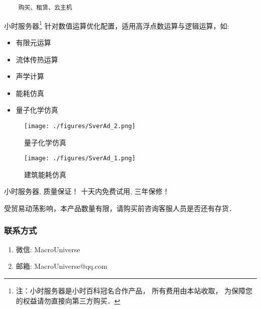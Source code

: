 
\begin{issues}
\issueDraft
\end{issues}



\begin{lstlisting}
    购买、租赁、云主机
\end{lstlisting}

小时服务器\footnote{注：小时服务器是小时百科冠名合作产品， 所有费用由本站收取， 为保障您的权益请勿直接向第三方购买．} 针对数值运算优化配置，适用高浮点数运算与逻辑运算，如:
\begin{itemize}
\item 有限元运算
\item 流体传热运算
\item 声学计算
\item 能耗仿真
\item 量子化学仿真
\end{itemize}
\begin{figure}[ht]
\centering
\texttt{[image: ./figures/SverAd\_2.png]}
\caption{量子化学仿真} \label{SverAd_fig2}
\end{figure}
\begin{figure}[ht]
\centering
\texttt{[image: ./figures/SverAd\_1.png]}
\caption{建筑能耗仿真} \label{SverAd_fig1}
\end{figure}

小时服务器, 质量保证！ 十天内免费试用, 三年保修！



受贸易动荡影响，本产品数量有限，请购买前咨询客服人员是否还有存货．
\subsubsection{联系方式}
\begin{enumerate}
\item 微信: MacroUniverse
\item 邮箱: MacroUniverse@qq.com
\end{enumerate}


